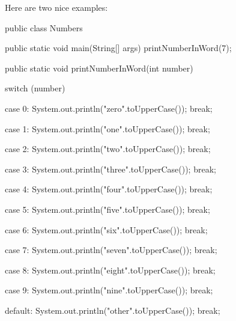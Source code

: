 Here are two nice examples:
\begin{listing}{1}
public class Numbers {
    public static void main(String[] args) {
    printNumberInWord(7);
    }

    public static void printNumberInWord(int number) {
    switch (number) {
        case 0:
            System.out.println("zero".toUpperCase());
            break;

        case 1:
            System.out.println("one".toUpperCase());
            break;

        case 2:
            System.out.println("two".toUpperCase());
            break;

        case 3:
            System.out.println("three".toUpperCase());
            break;

        case 4:
            System.out.println("four".toUpperCase());
            break;

        case 5:
            System.out.println("five".toUpperCase());
            break;

        case 6:
            System.out.println("six".toUpperCase());
            break;

        case 7:
            System.out.println("seven".toUpperCase());
            break;

        case 8:
            System.out.println("eight".toUpperCase());
            break;

        case 9:
            System.out.println("nine".toUpperCase());
            break;

        default:
            System.out.println("other".toUpperCase());
            break;
    }
    }

}
\end{listing}


